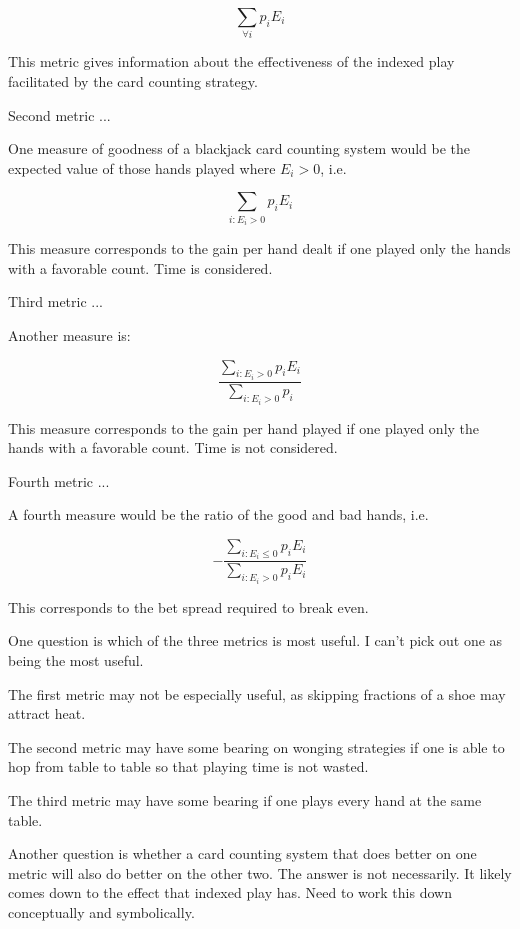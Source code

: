 \begin{equation}
\label{eq:cmct0:sctp0:sgcs0:01}
\sum_{\forall i} p_i E_i
\end{equation}

This metric gives information about the effectiveness of the indexed play facilitated
by the card counting strategy.

Second metric ...

One measure of goodness of a blackjack card counting system would be the
expected value of those hands played where $E_i > 0$, i.e.

\begin{equation}
\label{eq:cmct0:sctp0:sgcs0:02}
\sum_{i: E_i > 0} p_i E_i
\end{equation}

\noindent{}This measure corresponds to the gain per hand dealt if one
played only the hands with a favorable count.  Time is considered.

Third metric ...

Another measure is:

\begin{equation}
\label{eq:cmct0:sctp0:sgcs0:03}
\frac{\sum_{i: E_i > 0} p_i E_i}{\sum_{i: E_i > 0}p_i}
\end{equation}

\noindent{}This measure corresponds to the gain per hand played if one
played only the hands with a favorable count.  Time is not considered.

Fourth metric ...

A fourth measure would be the ratio of the good and bad hands, i.e.

\begin{equation}
\label{eq:cmct0:sctp0:sgcs0:04}
-\frac{\sum_{i: E_i \leq 0} p_i E_i}{\sum_{i: E_i > 0}p_i E_i}
\end{equation}

\noindent{}This corresponds to the bet spread required to break even.

One question is which of the three metrics is most useful.  I can't pick out
one as being the most useful.

The first metric may not be especially useful, as
skipping fractions of a shoe may attract heat.

The second metric may have some bearing on wonging strategies if one
is able to hop from table to table so that playing time is not wasted.

The third metric may have some bearing if one plays every hand at the same
table.

Another question is whether a card counting system that does better on one metric
will also do better on the other two.  The answer is not necessarily.
It likely comes down to the effect that indexed play has.
Need to work this down conceptually and symbolically.

